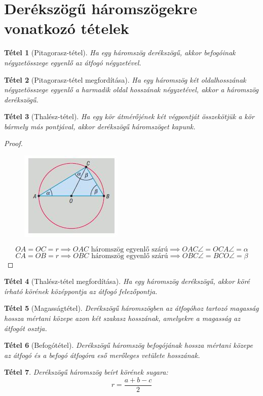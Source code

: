 \documentclass[twoside,12pt]{report}
\newtheorem{theorem}{Tétel}[section]
\theoremstyle{definition}
\begin{document}
\section{Derékszögű háromszögekre vonatkozó tételek}
	\begin{theorem}[Pitagorasz-tétel]
		Ha egy háromszög derékszögű, akkor befogóinak négyzetösszege egyenlő az átfogó négyzetével.
	\end{theorem}
	\begin{theorem}[Pitagorasz-tétel megfordítása]
		Ha egy háromszög két oldalhosszának négyzetösszege egyenlő a harmadik oldal hosszának négyzetével, akkor a háromszög derékszögű.
	\end{theorem}
	\begin{theorem}[Thalész-tétel]
		Ha egy kör átmérőjének két végpontját összekötjük a kör bármely más pontjával, akkor derékszögű háromszöget kapunk.
	\end{theorem}
	\begin{proof}
		\begin{figure}[H]
			\centering
			\includegraphics[width=0.4\linewidth]{Thalész.JPG}
			\caption{}
			\label{fig:thalesz}
		\end{figure}
		\begin{equation*}
			OA=OC=r\implies OAC \text{ háromszög egyenlő szárú} \implies OAC\angle=OCA\angle=\alpha
		\end{equation*}
		\begin{equation*}
		CA=OB=r\implies OBC \text{ háromszög egyenlő szárú}\implies OBC\angle=BCO\angle=\beta
		\end{equation*}
	\end{proof}
	\begin{theorem}[Thalész-tétel megfordítása]
		Ha egy háromszög derékszögű, akkor köré írható körének középpontja az átfogó felezőpontja.
	\end{theorem}
	\begin{theorem}[Magasságtétel]
		Derékszögű háromszögben az átfogóhoz tartozó magasság hossza mértani közepe azon két szakasz hosszának, amelyekre a magasság az átfogót osztja.
	\end{theorem}
	\begin{theorem}[Befogótétel]
		Derékszögű háromszög befogójának hossza mértani közepe az átfogó és a befogó
		átfogóra eső merőleges vetülete hosszának.
	\end{theorem}
	\begin{theorem}
		Derékszögű háromszög beírt körének sugara:
		\begin{equation*}
			r=\frac{a+b-c}{2}
		\end{equation*}
	\end{theorem}
\end{document}

